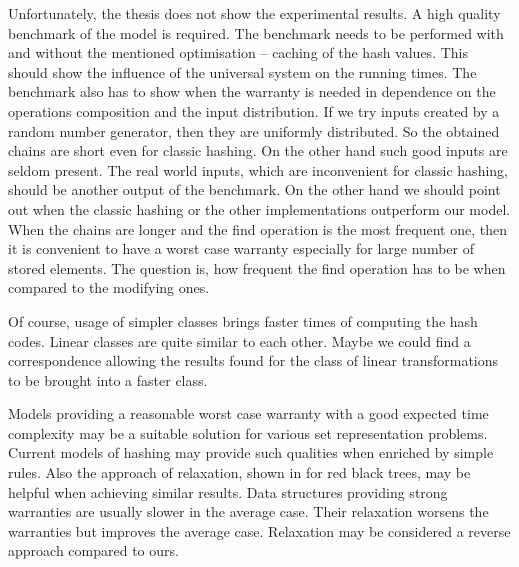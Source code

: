 Unfortunately, the thesis does not show the experimental results. A high quality benchmark of the model is required. The benchmark needs to be performed with and without the mentioned optimisation -- caching of the hash values. This should show the influence of the universal system on the running times. The benchmark also has to show when the warranty is needed in dependence on the operations composition and the input distribution. If we try inputs created by a random number generator, then they are uniformly distributed. So the obtained chains are short even for classic hashing. On the other hand such good inputs are seldom present. The real world inputs, which are inconvenient for classic hashing, should be another output of the benchmark. On the other hand we should point out when the classic hashing or the other implementations outperform our model. When the chains are longer and the find operation is the most frequent one, then it is convenient to have a worst case warranty especially for large number of stored elements. The question is, how frequent the find operation has to be when compared to the modifying ones.

Of course, usage of simpler classes brings faster times of computing the hash codes. Linear classes are quite similar to each other. Maybe we could find a correspondence allowing the results found for the class of linear transformations to be brought into a faster class.

Models providing a reasonable worst case warranty with a good expected time complexity may be a suitable solution for various set representation problems. Current models of hashing may provide such qualities when enriched by simple rules. Also the approach of relaxation, shown in \cite{752883} for red black trees, may be helpful when achieving similar results. Data structures providing strong warranties are usually slower in the average case. Their relaxation worsens the warranties but improves the average case. Relaxation may be considered a reverse approach compared to ours.
